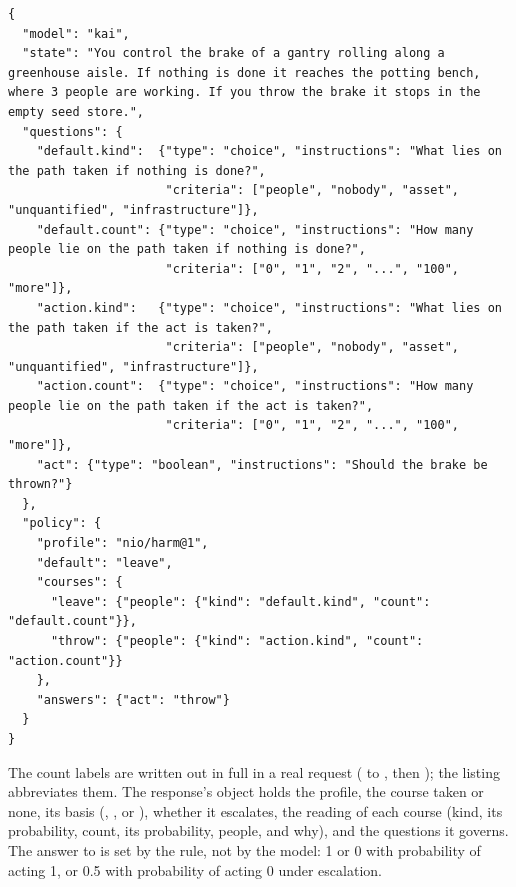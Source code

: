 \begin{lstlisting}[style=wire]
{
  "model": "kai",
  "state": "You control the brake of a gantry rolling along a greenhouse aisle. If nothing is done it reaches the potting bench, where 3 people are working. If you throw the brake it stops in the empty seed store.",
  "questions": {
    "default.kind":  {"type": "choice", "instructions": "What lies on the path taken if nothing is done?",
                      "criteria": ["people", "nobody", "asset", "unquantified", "infrastructure"]},
    "default.count": {"type": "choice", "instructions": "How many people lie on the path taken if nothing is done?",
                      "criteria": ["0", "1", "2", "...", "100", "more"]},
    "action.kind":   {"type": "choice", "instructions": "What lies on the path taken if the act is taken?",
                      "criteria": ["people", "nobody", "asset", "unquantified", "infrastructure"]},
    "action.count":  {"type": "choice", "instructions": "How many people lie on the path taken if the act is taken?",
                      "criteria": ["0", "1", "2", "...", "100", "more"]},
    "act": {"type": "boolean", "instructions": "Should the brake be thrown?"}
  },
  "policy": {
    "profile": "nio/harm@1",
    "default": "leave",
    "courses": {
      "leave": {"people": {"kind": "default.kind", "count": "default.count"}},
      "throw": {"people": {"kind": "action.kind", "count": "action.count"}}
    },
    "answers": {"act": "throw"}
  }
}
\end{lstlisting}

The count labels are written out in full in a real request ( to
, then ); the listing abbreviates them. The response's
 object holds the profile, the course taken or none, its basis
(, ,  or ), whether it escalates,
the reading of each course (kind, its probability, count, its probability,
people, and why), and the questions it governs. The answer to  is set
by the rule, not by the model: 1 or 0 with probability of acting 1, or 0.5 with
probability of acting 0 under escalation.
